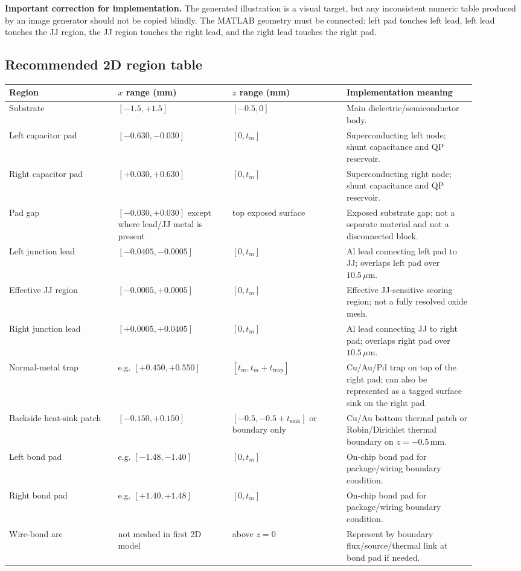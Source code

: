 \documentclass[11pt]{article}
\begin{document}
\begin{notebox}
\textbf{Important correction for implementation.} The generated illustration is a visual target, but any inconsistent numeric table produced by an image generator should not be copied blindly. The MATLAB geometry must be connected: left pad touches left lead, left lead touches the JJ region, the JJ region touches the right lead, and the right lead touches the right pad.
\end{notebox}

\subsection{Recommended 2D region table}
\begin{longtable}{>{\RaggedRight\arraybackslash}p{0.21\linewidth} >{\RaggedRight\arraybackslash}p{0.22\linewidth} >{\RaggedRight\arraybackslash}p{0.22\linewidth} >{\RaggedRight\arraybackslash}p{0.25\linewidth}}
\toprule
\textbf{Region} & \textbf{$x$ range (mm)} & \textbf{$z$ range (mm)} & \textbf{Implementation meaning}\\
\midrule
Substrate & $[-1.5,+1.5]$ & $[-0.5,0]$ & Main dielectric/semiconductor body.\\
Left capacitor pad & $[-0.630,-0.030]$ & $[0,t_m]$ & Superconducting left node; shunt capacitance and QP reservoir.\\
Right capacitor pad & $[+0.030,+0.630]$ & $[0,t_m]$ & Superconducting right node; shunt capacitance and QP reservoir.\\
Pad gap & $[-0.030,+0.030]$ except where lead/JJ metal is present & top exposed surface & Exposed substrate gap; not a separate material and not a disconnected block.\\
Left junction lead & $[-0.0405,-0.0005]$ & $[0,t_m]$ & Al lead connecting left pad to JJ; overlaps left pad over $10.5\,\mu\mathrm{m}$.\\
Effective JJ region & $[-0.0005,+0.0005]$ & $[0,t_m]$ & Effective JJ-sensitive scoring region; not a fully resolved oxide mesh.\\
Right junction lead & $[+0.0005,+0.0405]$ & $[0,t_m]$ & Al lead connecting JJ to right pad; overlaps right pad over $10.5\,\mu\mathrm{m}$.\\
Normal-metal trap & e.g. $[+0.450,+0.550]$ & $[t_m,t_m+t_{\mathrm{trap}}]$ & Cu/Au/Pd trap on top of the right pad; can also be represented as a tagged surface sink on the right pad.\\
Backside heat-sink patch & $[-0.150,+0.150]$ & $[-0.5,-0.5+t_{\mathrm{sink}}]$ or boundary only & Cu/Au bottom thermal patch or Robin/Dirichlet thermal boundary on $z=-0.5\,\mathrm{mm}$.\\
Left bond pad & e.g. $[-1.48,-1.40]$ & $[0,t_m]$ & On-chip bond pad for package/wiring boundary condition.\\
Right bond pad & e.g. $[+1.40,+1.48]$ & $[0,t_m]$ & On-chip bond pad for package/wiring boundary condition.\\
Wire-bond arc & not meshed in first 2D model & above $z=0$ & Represent by boundary flux/source/thermal link at bond pad if needed.\\
\bottomrule
\end{longtable}
\end{document}
